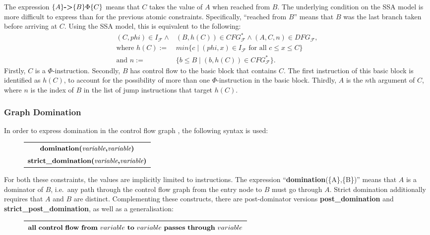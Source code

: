     \noindent
    The expression $\{A\}\text{\bf ->}\{B\}\Phi\{C\}$ means that
    $C$ takes the value of $A$ when reached from $B$.
    The underlying condition on the SSA model is more difficult to express than
    for the previous atomic constraints.
    Specifically, ``reached from $B$'' means that $B$ was the last branch
    taken before arriving at $C$.
    Using the SSA model, this is equivalent to the following:
    \begin{align*}
        (C,phi)\in I_\mathcal F\mathrel\land{}&(B,h(C))\in CFG_\mathcal F^*\mathrel\land(A,C,n)\in DFG_\mathcal F,\\
            \text{where }h(C):={}&min\{c\mid (phi,x)\in I_\mathcal F\text{ for all }c\leq x\leq C\}\\
            \text{and }n:={}&\{b\leq B\mid (b,h(C))\in CFG_\mathcal F^*\}.
    \end{align*}
    Firstly, $C$ is a $\Phi$-instruction.
    Secondly, $B$ has control flow to the basic block that contains $C$.
    The first instruction of this basic block is identified as $h(C)$, to
    account for the possibility of more than one $\Phi$-instruction in the
    basic block.
    Thirdly, $A$ is the $n$th argument of $C$, where $n$ is the index of $B$ in
    the list of jump instructions that target $h(C)$.

\subsubsection{Graph Domination}

    In order to express domination in the control flow graph
    \citep{Cytron:1989:AGD:73141.74823}, the following syntax is used:
\begin{figure}[h]
    \centering
    \begin{tabular}{|c|}
        \hline
        $\text{\bf domination(}\text{\it variable}\text{\bf,} \text{\it variable}\text{\bf)}$\\
        $\text{\bf strict\_domination(}\text{\it variable}\text{\bf,} \text{\it variable}\text{\bf)}$\\
        \hline
    \end{tabular}
\end{figure}

    \noindent
    For both these constraints, the values are implicitly limited to
    instructions.
    The expression ``{\bf domination}(\{A\},\{B\})'' means that $A$ is a
    dominator of $B$, i.e.\ any path through the control flow graph from the
    entry node to $B$ must go through $A$.
    Strict domination additionally requires that $A$ and $B$ are distinct.
    Complementing these constructs, there are post-dominator versions
    {\bf post\_domination} and {\bf strict\_post\_domination}, as well as a
    generalisation:
\begin{figure}[h]
    \centering
    \begin{tabular}{|c|}
        \hline
        ${\bf all}\ {\bf control}\ {\bf flow}\ {\bf from}\ variable\ {\bf to}\ variable\ {\bf passes}\ {\bf through}\ variable$\\
        \hline
    \end{tabular}
\end{figure}

